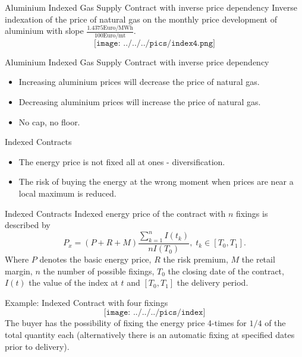 {Aluminium Indexed Gas Supply Contract with inverse price dependency}
Inverse indexation of the price of natural gas on the monthly price development of aluminium with slope $\frac{1.4375\text{Euro/MWh}}{100\text{Euro/mt}}$.
$$\texttt{[image: ../../../pics/index4.png]}$$



{Aluminium Indexed Gas Supply Contract with inverse price dependency}
\begin{itemize}
  \item<1-> Increasing aluminium prices will decrease the price of natural gas.
  \item<2-> Decreasing aluminium prices will increase the price of natural gas.
  \item<3-> No cap, no floor.
\end{itemize}







{Indexed Contracts}
\begin{itemize}
  \item The energy price is not fixed all at ones - diversification.
  \item The risk of buying the energy at the wrong moment when prices are near a local maximum is reduced.
\end{itemize}



{Indexed Contracts}
Indexed energy price of the contract with $n$ fixings is described by
$$P_x=(P+R+M)\frac{\sum_{k=1}^n{I(t_k)}}{nI(T_0)},\;t_k\in[T_0,T_1].$$
Where $P$ denotes the basic energy price, $R$ the risk premium, $M$ the retail margin, $n$ the number of possible fixings,
$T_0$ the closing date of the contract, $I(t)$ the value of the index at $t$ and $[T_0,T_1]$ the delivery period.



{Example: Indexed Contract with four fixings}
$$\texttt{[image: ../../../pics/index]}$$
The buyer has the possibility of fixing the energy price 4-times for $1/4$ of the total quantity each (alternatively there is an automatic fixing at specified dates prior to delivery).



